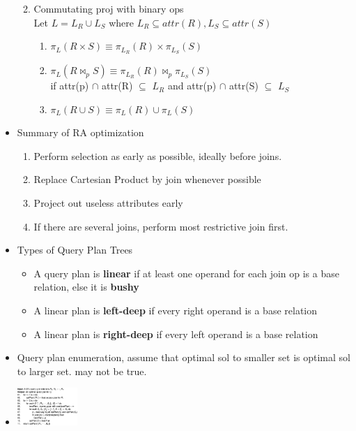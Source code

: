 \documentclass[9pt, landscape]{extarticle}
\begin{document}
\begin{multicols*}{4}
\begin{itemize}
\begin{enumerate}
\begin{enumerate}
      \end{enumerate}
      \item Commutating proj with binary ops\\Let $L = L_R \cup L_S$ where $L_R \subseteq attr(R), L_S \subseteq attr(S)$
      \begin{enumerate}
        \item $\pi_L(R \times S) \equiv \pi_{L_R}(R) \times \pi_{L_S}(S)$
        \item $\pi_L(R \bowtie_p S) \equiv \pi_{L_R}(R) \bowtie_p \pi_{L_S}(S)$\\if attr(p) $\cap$ attr(R) $\subseteq$ $L_R$ and attr(p) $\cap$ attr(S) $\subseteq$ $L_S$ 
        \item $\pi_L(R \cup S) \equiv \pi_L (R) \cup \pi_L (S)$
      \end{enumerate}
    \end{enumerate}
    \item Summary of RA optimization
    \begin{enumerate}
      \item Perform selection as early as possible, ideally before joins.
      \item Replace Cartesian Product by join whenever possible
      \item Project out useless attributes early
      \item If there are several joins, perform most restrictive join first.
    \end{enumerate}
    \item Types of Query Plan Trees
    \begin{itemize}
      \item A query plan is \textbf{linear} if at least one operand for each join op is a base relation, else it is \textbf{bushy}
      \item A linear plan is \textbf{left-deep} if every right operand is a base relation
      \item A linear plan is \textbf{right-deep} if every left operand is a base relation
    \end{itemize}  
    \item Query plan enumeration, assume that optimal sol to smaller set is optimal sol to larger set. may not be true.
    \item \includegraphics[width=0.18\textwidth]{cs3223-query-enumeration-algo.png}

\end{itemize}
\end{multicols*}
\end{document}
